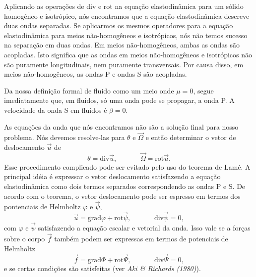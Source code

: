 Aplicando as opera\c{c}\~oes de div e rot na equa\c{c}\~ao
elastodin\^amica para um s\'olido homog\^eneo e isotr\'opico,
n\'os encontramos que a equa\c{c}\~ao elastodin\^amica descreve
duas ondas separadas. Se aplicarmos os mesmos operadores para a
equa\c{c}\~ao elastodin\^amica para meios n\~ao-homog\^eneos e
isotr\'opicos, n\'os n\~ao temos sucesso na separa\c{c}\~ao em
duas ondas. Em meios n\~ao-homog\^eneos, ambas as ondas s\~ao
acopladas. Isto significa que as ondas em meios n\~ao-homog\^eneos
e isotr\'opicos n\~ao s\~ao puramente longitudinais, nem puramente
transversais. Por causa disso, em meios n\~ao-homog\^eneos, as
ondas P e ondas S s\~ao acopladas.

Da nossa defini\c{c}\~ao formal de fluido como um meio onde $\mu=0$,
segue imediatamente que, em fluidos, s\'o uma onda pode se propagar,
a onda P. A velocidade da onda S em fluidos \'e $\beta=0$.

As equa\c{c}\~oes da onda que n\'os encontramos n\~ao s\~ao a
solu\c{c}\~ao final para nosso problema. N\'os devemos resolve-las
para $\theta$ e $\vec{\Omega}$ e ent\~ao determinar o
vetor de deslocamento $\vec{u}$ de
\begin{equation}
\theta=\mbox{div}\vec{u}, \mbox{  }\mbox{  }\mbox{  }\mbox{  }\mbox{  }\vec{\Omega}=\mbox{rot}\vec{u} .
\end{equation}
Esse procedimento complicado pode ser evitado pelo uso do teorema
de Lam\'e. A principal id\'eia \'e expressar o vetor deslocamento
satisfazendo a equa\c{c}\~ao elastodin\^amica como dois termos
separados correspondendo as ondas P e S. De acordo com o teorema,
o vetor deslocamento pode ser espresso em termos dos pontenciais
de Helmholtz $\varphi$ e $\vec{\psi}$,
\begin{equation}
\vec{u}=\mbox{grad}\varphi+\mbox{rot}\vec{\psi}, \mbox{  }\mbox{  }\mbox{  }\mbox{  }\mbox{  } \mbox{div}\vec{\psi}=0 ,
\end{equation}
com $\varphi$ e $\vec{\psi}$ satisfazendo a equa\c{c}\~ao escalar
e vetorial da onda. Isso vale se a for\c{c}as sobre o corpo
$\vec{f}$  tamb\'em podem ser expressas em termos de potenciais de Helmholtz
\begin{equation}
\vec{f}=\mbox{grad}\Phi+\mbox{rot}\vec{\Psi}, \mbox{  }\mbox{  }\mbox{  }\mbox{  }\mbox{  } \mbox{div}\vec{\Psi}=0 ,
\end{equation}
e se certas condi\c{c}\~oes s\~ao satisfeitas (ver \textit{Aki \& Richards (1980)}).

